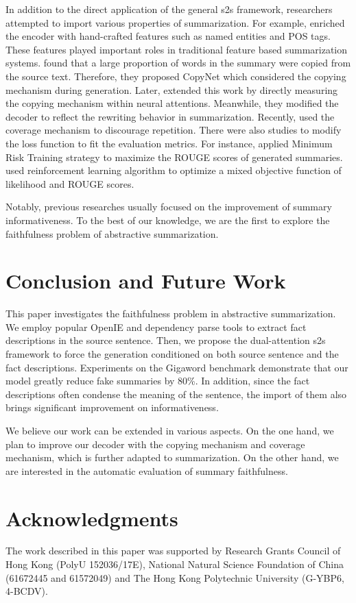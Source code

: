 \documentclass[letterpaper]{article} %
\begin{document}
	In addition to the direct application of the general s2s framework, researchers attempted to import various properties of summarization.
	For example, \cite{nallapati2016abstractive} enriched the encoder with hand-crafted features such as named entities and POS tags.
	These features played important roles in traditional feature based summarization systems.
	\cite{gu2016incorporating} found that a large proportion of words in the summary were copied from the source text.
	Therefore, they proposed CopyNet which considered the copying mechanism during generation.
	Later, \cite{ziqiang2017rnn} extended this work by directly measuring the copying mechanism within neural attentions.
	Meanwhile, they modified the decoder to reflect the rewriting behavior in summarization.
	Recently, \cite{see2017get} used the coverage mechanism to discourage repetition.
	There were also studies to modify the loss function to fit the evaluation metrics.
	For instance, \cite{ayana2016neural} applied Minimum Risk Training strategy to maximize the ROUGE scores of generated summaries.
	\cite{paulus2017deep} used reinforcement learning algorithm to optimize a mixed objective function of likelihood and ROUGE scores.
	
	Notably, previous researches usually focused on the improvement of summary informativeness.
	To the best of our knowledge, we are the first to explore the faithfulness problem of abstractive summarization.
	
	
	\section{Conclusion and Future Work}
	This paper investigates the faithfulness problem in abstractive summarization.
	We employ popular OpenIE and dependency parse tools to extract fact descriptions in the source sentence.
	Then, we propose the dual-attention s2s framework to force the generation conditioned on both source sentence and the fact descriptions.
	Experiments on the Gigaword benchmark demonstrate that our model greatly reduce fake summaries by 80\%.
	In addition, since the fact descriptions often condense the meaning of the sentence, the import of them also brings significant improvement on informativeness.
	
	We believe our work can be extended in various aspects.
	On the one hand, we plan to improve our decoder with the copying mechanism and coverage mechanism, which is further adapted to summarization.
	On the other hand, we are interested in the automatic evaluation of summary faithfulness.
	
	\section{ Acknowledgments}
	The work described in this paper was supported by Research Grants Council of Hong Kong (PolyU 152036/17E), National Natural Science Foundation of China (61672445 and 61572049) and The Hong Kong Polytechnic University (G-YBP6, 4-BCDV).
	
	
	
	
	
	
	
\end{document}
